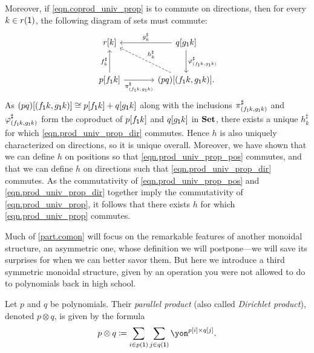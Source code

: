 \documentclass[Book-Poly]{subfiles}
\begin{document}
\begin{exercise}
\begin{solution}
    Moreover, if \eqref{eqn.coprod_univ_prop} is to commute on directions, then for every $k \in r(\textsf{1})$, the following diagram of sets must commute:
    \begin{equation} \label{eqn.prod_univ_prop_dir}
      \begin{tikzcd}[sep=large]
        r[k] & q[g_\1k] \ar[l, "g^\sharp_k"'] \ar[d, "\varphi^\sharp_{(f_\1k, g_\1k)}"] \\
        p[f_\1k] \ar[u, "f^\sharp_k"] \ar[r, "\pi^\sharp_{(f_\1k, g_\1k)}"'] & (pq)[(f_\1k, g_\1k)]. \ar[ul, "h^\sharp_k"', dashed]
      \end{tikzcd}
    \end{equation}
    As $(pq)[(f_{\textsf{1}}k, g_{\textsf{1}}k)] \cong p[f_{\textsf{1}}k] + q[g_{\textsf{1}}k]$ along with the inclusions $\pi^\sharp_{(f_{\textsf{1}}k, g_{\textsf{1}}k)}$ and $\varphi^\sharp_{(f_{\textsf{1}}k, g_{\textsf{1}}k)}$ form the coproduct of $p[f_{\textsf{1}}k]$ and $q[g_{\textsf{1}}k]$ in $\mathbf{Set}$, there exists a unique $h^\sharp_k$ for which \eqref{eqn.prod_univ_prop_dir} commutes.
    Hence $h$ is also uniquely characterized on directions, so it is unique overall.
    Moreover, we have shown that we can define $h$ on positions so that \eqref{eqn.prod_univ_prop_pos} commutes, and that we can define $h$ on directions such that \eqref{eqn.prod_univ_prop_dir} commutes.
    As the commutativity of \eqref{eqn.prod_univ_prop_pos} and \eqref{eqn.prod_univ_prop_dir} together imply the commutativity of \eqref{eqn.prod_univ_prop}, it follows that there exists $h$ for which \eqref{eqn.prod_univ_prop} commutes.
  \end{solution}
\end{exercise}

Much of \cref{part.comon} will focus on the remarkable features of another monoidal structure, an asymmetric one, whose definition we will postpone---we will save its surprises for when we can better savor them.
But here we introduce a third symmetric monoidal structure, given by an operation you were not allowed to do to polynomials back in high school.


\begin{definition} \label{def.parallel}
Let $p$ and $q$ be polynomials. Their \emph{parallel product} (also called \emph{Dirichlet product}), denoted $p\otimes q$, is given by the formula
\begin{equation}\label{eqn.parallel_def}
p\otimes q\coloneqq\sum_{i\in p(\1)}\sum_{j\in q(\1)}\yon^{p[i]\times q[j]}.
\end{equation}
\end{definition}
\end{document}
